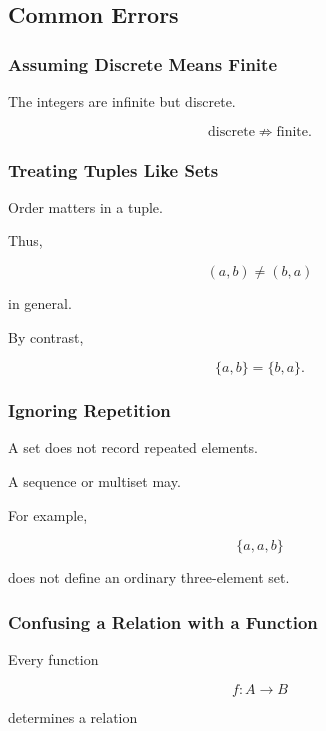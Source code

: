 \subsection{Common Errors}
\label{subsec:discrete-structures-common-errors}

\subsubsection{Assuming Discrete Means Finite}

The integers are infinite but discrete.

\[
\boxed{
\text{discrete}
\not\Longrightarrow
\text{finite}.
}
\]

\subsubsection{Treating Tuples Like Sets}

Order matters in a tuple.

Thus,

\[
(a,b)\neq(b,a)
\]

in general.

By contrast,

\[
\{a,b\}=\{b,a\}.
\]

\subsubsection{Ignoring Repetition}

A set does not record repeated elements.

A sequence or multiset may.

For example,

\[
\{a,a,b\}
\]

does not define an ordinary three-element set.

\subsubsection{Confusing a Relation with a Function}

Every function

\[
f:A\to B
\]

determines a relation


